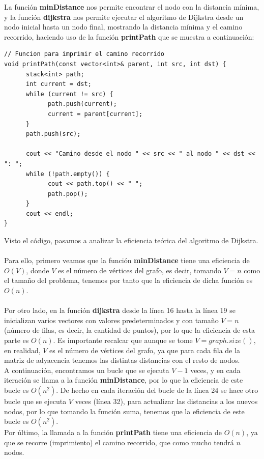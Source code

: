 \documentclass[11pt,openany]{book}
\begin{document}
La función \textbf{minDistance} nos permite encontrar el nodo con la distancia mínima, y la función \textbf{dijkstra} nos permite ejecutar
el algoritmo de Dijkstra desde un nodo inicial hasta un nodo final, mostrando la distancia mínima y el camino recorrido, haciendo uso
de la función \textbf{printPath} que se muestra a continuación:
\begin{lstlisting}
// Funcion para imprimir el camino recorrido
void printPath(const vector<int>& parent, int src, int dst) {
      stack<int> path;
      int current = dst;
      while (current != src) {
            path.push(current);
            current = parent[current];
      }
      path.push(src);

      cout << "Camino desde el nodo " << src << " al nodo " << dst << ": ";
      while (!path.empty()) {
            cout << path.top() << " ";
            path.pop();
      }
      cout << endl;
}
\end{lstlisting}
Visto el código, pasamos a analizar la eficiencia teórica del algoritmo de Dijkstra.\\ \\
Para ello, primero veamos que la función \textbf{minDistance} tiene una eficiencia de $O(V)$, donde $V$ es el número de vértices del grafo, es decir, tomando $V=n$
como el tamaño del problema, tenemos por tanto que la eficiencia de dicha función es $O(n)$. \\ \\
Por otro lado, en la función \textbf{dijkstra} desde la línea 16 hasta la línea 19 se inicializan varios vectores con valores
predeterminados y con tamaño $V=n$ (número de filas, es decir, la cantidad de puntos), por lo que la eficiencia de esta parte es $O(n)$. Es importante recalcar que aunque se tome 
$V=graph.size()$, en realidad, $V$ es el número de vértices del grafo, ya que para cada fila de la matriz de adyacencia tenemos las distintas distancias con el resto de nodos. \\
A continuación, encontramos un bucle que se ejecuta $V-1$ veces, y en cada iteración se llama a la función \textbf{minDistance}, por lo que la eficiencia de este bucle es $O(n^2)$. De hecho
en cada iteración del bucle de la línea 24 se hace otro bucle que se ejecuta $V$ veces (línea 32), para actualizar las distancias a los nuevos nodos, por lo que tomando la función suma, tenemos que la eficiencia de este bucle
es $O(n^2)$.\\
Por último, la llamada a la función \textbf{printPath} tiene una eficiencia de $O(n)$, ya que se recorre (imprimiento) el camino recorrido, que como mucho tendrá $n$ nodos.\\ \\
\end{document}
